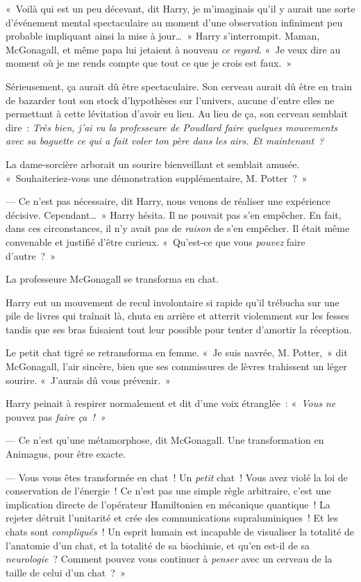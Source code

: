 «~Voilà qui est un peu décevant, dit Harry, je m'imaginais qu'il y aurait une sorte d'événement mental spectaculaire au moment d'une observation infiniment peu probable impliquant ainsi la mise à jour…~» Harry s'interrompit. Maman, McGonagall, et même papa lui jetaient à nouveau \emph{ce regard}. «~Je veux dire au moment où je me rends compte que tout ce que je crois est faux.~»

Sérieusement, ça aurait dû être spectaculaire. Son cerveau aurait dû être en train de bazarder tout son stock d'hypothèses sur l'univers, aucune d'entre elles ne permettant à cette lévitation d'avoir eu lieu. Au lieu de ça, son cerveau semblait dire~: \emph{Très bien, j'ai vu la professeure de Poudlard faire quelques mouvements avec sa baguette ce qui a fait voler ton père dans les airs. Et maintenant~?}

La dame-sorcière arborait un sourire bienveillant et semblait amusée. «~Souhaiteriez-vous une démonstration supplémentaire, M. Potter~?~»

--- Ce n'est pas nécessaire, dit Harry, nous venons de réaliser une expérience décisive. Cependant…~» Harry hésita. Il ne pouvait pas s'en empêcher. En fait, dans ces circonstances, il n'y avait pas de \emph{raison} de s'en empêcher. Il était même convenable et justifié d'être curieux. «~Qu'est-ce que vous \emph{pouvez} faire d'autre~?~»

La professeure McGonagall se transforma en chat.

Harry eut un mouvement de recul involontaire si rapide qu'il trébucha sur une pile de livres qui traînait là, chuta en arrière et atterrit violemment sur les fesses tandis que ses bras faisaient tout leur possible pour tenter d'amortir la réception.

Le petit chat tigré se retransforma en femme. «~Je suis navrée, M.  Potter,~» dit McGonagall, l'air sincère, bien que ses commissures de lèvres trahissent un léger sourire.  «~J'aurais dû vous prévenir.~»

Harry peinait à respirer normalement et dit d'une voix étranglée~: «~\emph{Vous ne} pouvez pas \emph{faire ça~!~»}

--- Ce n'est qu'une métamorphose, dit McGonagall. Une transformation en Animagus, pour être exacte.

--- Vous vous êtes transformée en chat~! Un \emph{petit} chat~! Vous avez violé la loi de conservation de l'énergie~! Ce n'est pas une simple règle arbitraire, c'est une implication directe de l'opérateur Hamiltonien en mécanique quantique~! La rejeter détruit l'unitarité et crée des communications supraluminiques~! Et les chats sont \emph{compliqués}~! Un esprit humain est incapable de visualiser la totalité de l'anatomie d'un chat, et la totalité de sa biochimie, et qu'en est-il de sa \emph{neurologie}~? Comment pouvez vous continuer à \emph{penser} avec un cerveau de la taille de celui d'un chat~?~»

